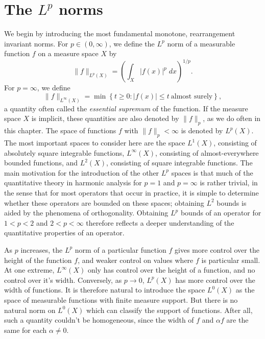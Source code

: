 \section{The $L^p$ norms}

We begin by introducing the most fundamental monotone, rearrangement invariant norms. For $p \in (0,\infty)$, we define the $L^p$ norm of a measurable function $f$ on a measure space $X$ by
%
\[ \| f \|_{L^p(X)} = \left( \int_X |f(x)|^p\; dx \right)^{1/p}. \]
%
For $p = \infty$, we define
%
\[ \| f \|_{L^\infty(X)} = \min \left\{ t \geq 0: |f(x)| \leq t\ \text{almost surely} \right\}, \]
%
a quantity often called the \emph{essential supremum} of the function. If the measure space $X$ is implicit, these quantities are also denoted by $\| f \|_p$, as we do often in this chapter. The space of functions $f$ with $\| f \|_p < \infty$ is denoted by $L^p(X)$. The most important spaces to consider here are the space $L^1(X)$, consisting of absolutely square integrable functions, $L^\infty(X)$, consisting of almost-everywhere bounded functions, and $L^2(X)$, consisting of square integrable functions. The main motivation for the introduction of the other $L^p$ spaces is that much of the quantitative theory in harmonic analysis for $p = 1$ and $p = \infty$ is rather trivial, in the sense that for most operators that occur in practice, it is simple to determine whether these operators are bounded on these spaces; obtaining $L^2$ bounds is aided by the phenomena of orthogonality. Obtaining $L^p$ bounds of an operator for $1 < p < 2$ and $2 < p < \infty$ therefore reflects a deeper understanding of the quantitative properties of an operator.

As $p$ increases, the $L^p$ norm of a particular function $f$ gives more control over the height of the function $f$, and weaker control on values where $f$ is particular small. At one extreme, $L^\infty(X)$ only has control over the height of a function, and no control over it's width. Conversely, as $p \to 0$, $L^p(X)$ has more control over the width of functions. It is therefore natural to introduce the space $L^0(X)$ as the space of measurable functions with finite measure support. But there is no natural norm on $L^0(X)$ which can classify the support of functions. After all, such a quantity couldn't be homogeneous, since the width of $f$ and $\alpha f$ are the same for each $\alpha \neq 0$.

